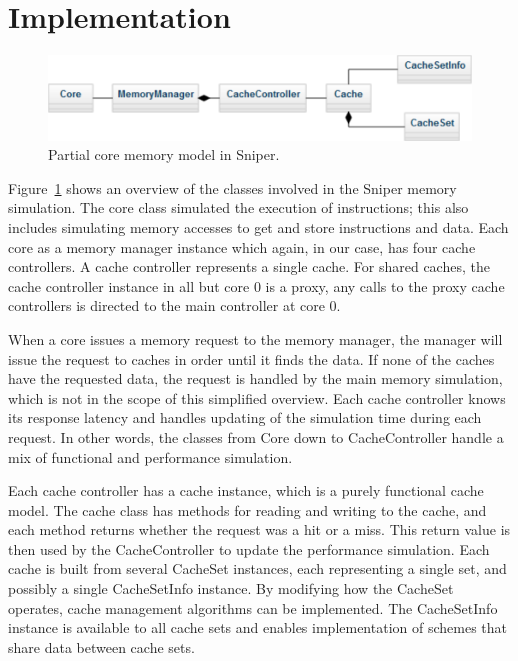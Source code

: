 \section{Implementation}
\label{sec:framework:implementation}

\begin{figure}[ht]
\centering
\includegraphics[scale=0.7]{figures/framework/functional_core_model}
\caption{Partial core memory model in Sniper.}
\label{fig:framework:implementation:core_memory}
\end{figure}

Figure~\ref{fig:framework:implementation:core_memory} shows an overview of the classes involved in the Sniper memory simulation.
The core class simulated the execution of instructions; this also includes simulating memory accesses to get and store instructions and data.
Each core as a memory manager instance which again, in our case, has four cache controllers.
A cache controller represents a single cache.
For shared caches, the cache controller instance in all but core 0 is a proxy, any calls to the proxy cache controllers is directed to the main controller at core 0.

When a core issues a memory request to the memory manager, the manager will issue the request to caches in order until it finds the data. 
If none of the caches have the requested data, the request is handled by the main memory simulation, which is not in the scope of this simplified overview.
Each cache controller knows its response latency and handles updating of the simulation time during each request.
In other words, the classes from Core down to CacheController handle a mix of functional and performance simulation.

Each cache controller has a cache instance, which is a purely functional cache model.
The cache class has methods for reading and writing to the cache, and each method returns whether the request was a hit or a miss.
This return value is then used by the CacheController to update the performance simulation.
Each cache is built from several CacheSet instances, each representing a single set, and possibly a single CacheSetInfo instance.
By modifying how the CacheSet operates, cache management algorithms can be implemented.
The CacheSetInfo instance is available to all cache sets and enables implementation of schemes that share data between cache sets.

